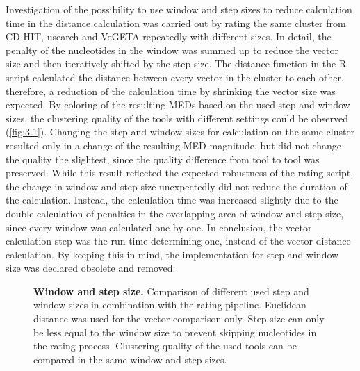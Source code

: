     Investigation of the possibility to use window and step sizes to reduce calculation time in the distance calculation was carried out by rating the same cluster from CD-HIT, usearch and VeGETA repeatedly with different sizes. In detail, the penalty of the nucleotides in the window was summed up to reduce the vector size and then iteratively shifted by the step size. The distance function in the R script calculated the distance between every vector in the cluster to each other, therefore, a reduction of the calculation time by shrinking the vector size was expected. By coloring of the resulting \glspl{MED} based on the used step and window sizes, the clustering quality of the tools with different settings could be observed (\autoref{fig:3.1}). Changing the step and window sizes for calculation on the same cluster resulted only in a change of the resulting \gls{MED} magnitude, but did not change the quality the slightest, since the quality difference from tool to tool was preserved. While this result reflected the expected robustness of the rating script, the change in window and step size unexpectedly did not reduce the duration of the calculation. Instead, the calculation time was increased slightly due to the double calculation of penalties in the overlapping area of window and step size, since every window was calculated one by one. In conclusion, the vector calculation step was the run time determining one, instead of the vector distance calculation. By keeping this in mind, the implementation for step and window size was declared obsolete and removed.

    \begin{figure}[!htb]
        \centering
        \caption[Window and step size]{\textbf{Window and step size.} Comparison of different used step and window sizes in combination with the rating pipeline. Euclidean distance was used for the vector comparison only. Step size can only be less equal to the window size to prevent skipping nucleotides in the rating process. Clustering quality of the used tools can be compared in the same window and step sizes.}
        \label{fig:3.1}
    \end{figure}
    
